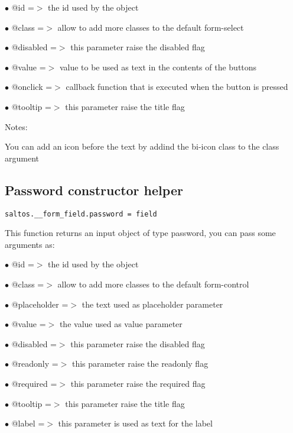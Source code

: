 \documentclass[a4paper]{book}
\begin{document}
\begin{compactitem}
\item[\color{myblue}$\bullet$] @id       =$>$ the id used by the object
\item[\color{myblue}$\bullet$] @class    =$>$ allow to add more classes to the default form-select
\item[\color{myblue}$\bullet$] @disabled =$>$ this parameter raise the disabled flag
\item[\color{myblue}$\bullet$] @value    =$>$ value to be used as text in the contents of the buttons
\item[\color{myblue}$\bullet$] @onclick  =$>$ callback function that is executed when the button is pressed
\item[\color{myblue}$\bullet$] @tooltip  =$>$ this parameter raise the title flag
\end{compactitem}

Notes:

You can add an icon before the text by addind the bi-icon class to the class argument

\hypertarget{toc391}{}
\subsection{Password constructor helper}

\begin{lstlisting}
saltos.__form_field.password = field
\end{lstlisting}

This function returns an input object of type password, you can pass some arguments as:

\begin{compactitem}
\item[\color{myblue}$\bullet$] @id          =$>$ the id used by the object
\item[\color{myblue}$\bullet$] @class       =$>$ allow to add more classes to the default form-control
\item[\color{myblue}$\bullet$] @placeholder =$>$ the text used as placeholder parameter
\item[\color{myblue}$\bullet$] @value       =$>$ the value used as value parameter
\item[\color{myblue}$\bullet$] @disabled    =$>$ this parameter raise the disabled flag
\item[\color{myblue}$\bullet$] @readonly    =$>$ this parameter raise the readonly flag
\item[\color{myblue}$\bullet$] @required    =$>$ this parameter raise the required flag
\item[\color{myblue}$\bullet$] @tooltip     =$>$ this parameter raise the title flag
\item[\color{myblue}$\bullet$] @label       =$>$ this parameter is used as text for the label
\end{compactitem}
\end{document}
